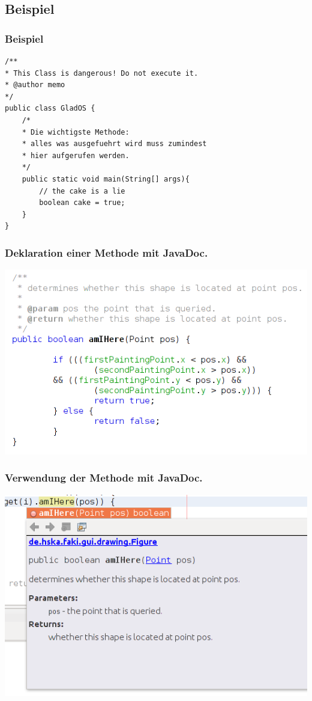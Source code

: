\documentclass[final]{beamer}
\begin{document}
\subsection{Beispiel}
\begin{frame}[containsverbatim]
\frametitle{Beispiel}
	\begin{lstlisting}
/**
* This Class is dangerous! Do not execute it.
* @author memo
*/
public class GladOS {
	/*
	* Die wichtigste Methode: 
	* alles was ausgefuehrt wird muss zumindest 
	* hier aufgerufen werden.
	*/
	public static void main(String[] args){
		// the cake is a lie
		boolean cake = true;
	}
}

	\end{lstlisting}
\end{frame}

\begin{frame}
	\frametitle{Deklaration einer Methode mit JavaDoc.}
	\includegraphics[scale=0.5]{JavaDoc_example_1_1.png}
\end{frame}

\begin{frame}
	\frametitle{Verwendung der Methode mit JavaDoc.}
	\includegraphics[scale=0.5]{JavaDoc_example_2_1.png}
\end{frame}
\end{document}
